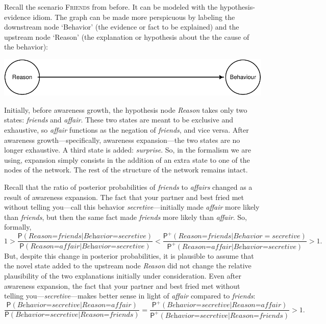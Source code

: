 \documentclass[
  11pt,
  dvipsnames,enabledeprecatedfontcommands]{scrartcl}
\newcommand{\pr}[1]{\ensuremath{\mathsf{P}(#1)}}
\newcommand{\ppr}[2]{\ensuremath{\mathsf{P}^{#1}(#2)}}
\begin{document}
Recall the scenario \textsc{Friends} from before. It can be modeled with
the hypothesis-evidence idiom. The graph can be made more perspicuous by
labeling the downstream node `Behavior' (the evidence or fact to be
explained) and the upstream node `Reason' (the explanation or hypothesis
about the the cause of the behavior):

\begin{center}\includegraphics[width=0.5\linewidth,height=0.5\textheight]{ReplyToSteeleStefansson5_files/figure-latex/friendsDAG-1} \end{center}

\noindent Initially, before awareness growth, the hypothesis node
\textit{Reason} takes only two states: \textit{friends} and
\textit{affair}. These two states are meant to be exclusive and
exhaustive, so \textit{affair} functions as the negation of
\textit{friends}, and vice versa. After awareness growth---specifically,
awareness expansion---the two states are no longer exhaustive. A third
state is added: \textit{surprise}. So, in the formalism we are using,
expansion simply consists in the addition of an extra state to one of
the nodes of the network. The rest of the structure of the network
remains intact.

Recall that the ratio of posterior probabilities of \textit{friends} to
\textit{affairs} changed as a result of awareness expansion. The fact
that your partner and best fried met without telling you---call this
behavior \textit{secretive}---initially made \textit{affair} more likely
than \textit{friends}, but then the same fact made \textit{friends} more
likely than \textit{affair}. So, formally,
\[1>\frac{\pr{\textit{Reason=friends} \vert \textit{Behavior=secretive}}}{\pr{\textit{Reason=affair} \vert \textit{Behavior=secretive}}} < \frac{\ppr{+}{\textit{Reason=friends} \vert Behavior=secretive}}{\ppr{+}{\textit{Reason=affair} \vert \textit{Behavior=secretive}}}>1.\]
But, despite this change in posterior probabilities, it is plausible to
assume that the novel state added to the upstream node \textit{Reason}
did not change the relative plausibility of the two explanations
initially under consideration. Even after awareness expansion, the fact
that your partner and best fried met without telling
you---\textit{secretive}---makes better sense in light of
\textit{affair} compared to \textit{friends}:
\[\frac{\pr{\textit{Behavior=secretive} \vert \textit{Reason=affair}}}{\pr{\textit{Behavior=secretive} \vert  \textit{Reason=friends}}} = \frac{\ppr{+}{\textit{Behavior=secretive} \vert \textit{Reason=affair}}}{\ppr{+}{\textit{Behavior=secretive} \vert \textit{Reason=friends}}}>1.\]
\end{document}
